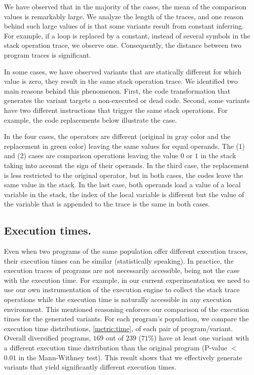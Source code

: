 We have observed that in the majority of the cases, the mean of the comparison values is remarkably large. We analyze the length of the traces, and one reason behind such large values of \DTW is that some variants result from constant inferring. For example, if a loop is replaced by a constant, instead of several symbols in the stack operation trace, we observe one. Consequently, the distance between two program traces is significant. 

In some cases, we have observed variants that are statically different for which \DTW value is zero, \ie they result in the same stack operation trace. We identified two main reasons behind this phenomenon. First, the code transformation that generates the variant targets a non-executed or dead code. Second, some variants have two different instructions that trigger the same stack operations. For example, the code replacements below illustrate the case. 



In the four cases, the operators are different (original in gray color and the replacement in green color) leaving the same values for equal operands.
The (1) and (2) cases are comparison operations leaving the value $0$ or $1$ in the stack taking into account the sign of their operands.  In the third case, the replacement is less restricted to the original operator, but in both cases, the codes leave the same value in the stack. In the last case, both operands load a value of a local variable in the stack, the index of the local variable is different but the value of the variable that is appended to the trace is the same in both cases. 

\subsection*{Execution times.}

Even when two programs of the same population offer different execution traces, their execution times can be similar (statistically speaking). In practice, the execution traces of \wasm programs are not necessarily accessible, being not the case with the execution time. For example, in our current experimentation we need to use our own instrumentation of the execution engine to collect the stack trace operations while the execution time is naturally accessible in any execution environment. This mentioned reasoning enforces our comparison of the execution times for the generated variants.
For each program's population, we compare the execution time distributions, \autoref{metric:time}, of each pair of program/variant.
Overall diversified programs, $169$ out of $239$ ($71\%$) have at least one variant with a different execution time distribution than the original program (P-value $<$ $0.01$ in the Mann-Withney test). This result shows that we effectively generate variants that yield significantly different execution times.

